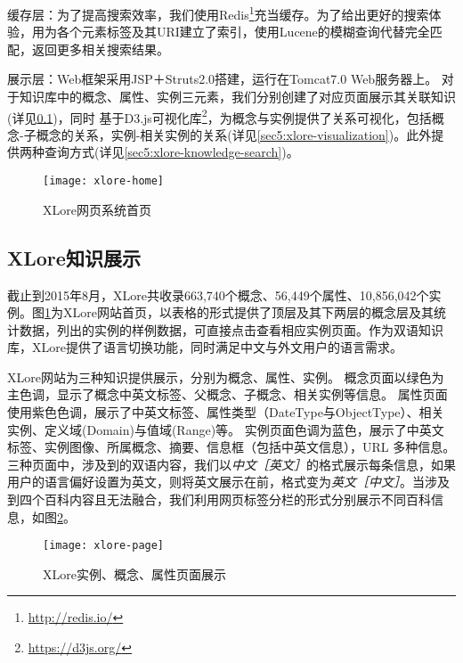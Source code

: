 
{\heiti 缓存层：}为了提高搜索效率，我们使用Redis\footnote{\url{http://redis.io/}}充当缓存。为了给出更好的搜索体验，用为各个元素标签及其URI建立了索引，使用Lucene的模糊查询代替完全匹配，返回更多相关搜索结果。

{\heiti 展示层：}Web框架采用JSP＋Struts2.0搭建，运行在Tomcat7.0 Web服务器上。
对于知识库中的概念、属性、实例三元素，我们分别创建了对应页面展示其关联知识(详见\ref{sec5:xlore-knowledge-representation})，同时
基于D3.js可视化库\footnote{\url{https://d3js.org/}}，为概念与实例提供了关系可视化，包括概念-子概念的关系，实例-相关实例的关系(详见\ref{sec5:xlore-visualization})。此外提供两种查询方式(详见\ref{sec5:xlore-knowledge-search})。

\begin{figure}[ht]
  \centering
  \texttt{[image: xlore-home]}
  \caption{XLore网页系统首页}
  \label{fig:xlore-home}
\end{figure}

\subsection{XLore知识展示}
\label{sec5:xlore-knowledge-representation}
截止到2015年8月，XLore共收录663,740个概念、56,449个属性、10,856,042个实例。图\ref{fig:xlore-home}为XLore网站首页，以表格的形式提供了顶层及其下两层的概念层及其统计数据，列出的实例的样例数据，可直接点击查看相应实例页面。作为双语知识库，XLore提供了语言切换功能，同时满足中文与外文用户的语言需求。

XLore网站为三种知识提供展示，分别为概念、属性、实例。
概念页面以绿色为主色调，显示了概念中英文标签、父概念、子概念、相关实例等信息。
属性页面使用紫色色调，展示了中英文标签、属性类型（DateType与ObjectType）、相关实例、定义域(Domain)与值域(Range)等。
实例页面色调为蓝色，展示了中英文标签、实例图像、所属概念、摘要、信息框（包括中英文信息），URL 多种信息。三种页面中，涉及到的双语内容，我们以\textit{中文［英文］}的格式展示每条信息，如果用户的语言偏好设置为英文，则将英文展示在前，格式变为\textit{英文［中文］}。当涉及到四个百科内容且无法融合，我们利用网页标签分栏的形式分别展示不同百科信息，如图\ref{fig:xlore-page}。

\begin{figure}[ht]
  \centering
  \texttt{[image: xlore-page]}
  \caption{XLore实例、概念、属性页面展示}
  \label{fig:xlore-page}
\end{figure}

